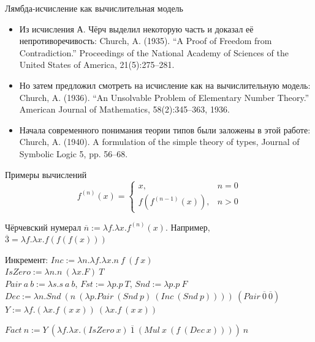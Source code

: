 \documentclass[aspectratio=169]{beamer}
\begin{document}
\begin{frame}{Лямбда-исчисление как вычислительная модель}
\begin{itemize}
\item Из исчисления А. Чёрч выделил некоторую часть и доказал её непротиворечивость:
Church, A. (1935). “A Proof of Freedom from Contradiction.” Proceedings of the National Academy of Sciences of the United States of America, 21(5):275–281.
\item Но затем предложил смотреть на исчисление как на вычислительную модель:
Church, A. (1936). “An Unsolvable Problem of Elementary Number Theory.” American Journal of Mathematics, 58(2):345–363, 1936.
\item Начала современного понимания теории типов были заложены в этой работе:
Church, A. (1940). A formulation of the simple theory of types, Journal of Symbolic Logic 5, pp. 56–68.
\end{itemize}
\end{frame}

\begin{frame}{Примеры вычислений}
$$f^{(n)}(x) = \left\{\begin{array}{ll}x, & n = 0\\f(f^{(n-1)}(x)), & n > 0\end{array}\right.$$

\begin{dfn}
Чёрчевский нумерал $\overline{n} := \lambda f.\lambda x.f^{(n)}(x)$.
Например, $\overline{3} = \lambda f.\lambda x.f(f(f(x)))$\\
\end{dfn}

\begin{exm}
Инкремент: $Inc := \lambda n.\lambda f.\lambda x.n\ f\ (f\ x)$\\
$IsZero := \lambda n.n\ (\lambda x.F)\ T$\\
$Pair\ a\ b := \lambda s.s\ a\ b$, $Fst := \lambda p.p\ T$, $Snd := \lambda p.p\ F$\\
$Dec := \lambda n.Snd\ (n\ (\lambda p.Pair\ (Snd\ p)\ (Inc\ (Snd\ p))))\ (Pair\ \overline{0}\ \overline{0})$\\
$Y := \lambda f.(\lambda x.f\ (x\ x))\ (\lambda x.f\ (x\ x))$
\end{exm}


\begin{exm}
$Fact\ n := Y\ (\lambda f.\lambda x.(IsZero\ x)\ \overline{1}\ (Mul\ x\ (f\ (Dec\ x))))\ n$
\end{exm}

\end{frame}
\end{document}
